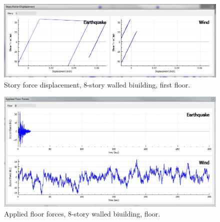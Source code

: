\documentclass[onecolumn, fleqn]{article}
\begin{document}
\begin{figure}[H]
	\centering \includegraphics[scale=0.35]{8_walled_bldg_sfd.JPG}
	\caption{Story force displacement, 8-story walled biuilding, first floor.}
\end{figure}
\begin{figure}[H]
	\centering \includegraphics[scale=0.35]{8_walled_bldg_aff.JPG}
	\caption{Applied floor forces, 8-story walled biuilding,  floor.}
\end{figure}




\newpage
%


\end{document}
